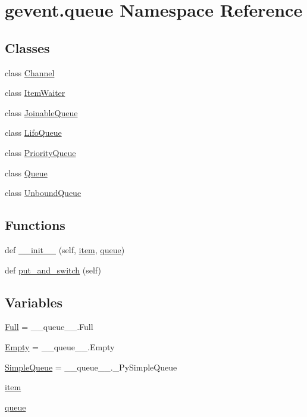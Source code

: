 \hypertarget{namespacegevent_1_1queue}{}\section{gevent.\+queue Namespace Reference}
\label{namespacegevent_1_1queue}
\subsection*{Classes}
\begin{DoxyCompactItemize}
\item 
class \hyperlink{classgevent_1_1queue_1_1_channel}{Channel}
\item 
class \hyperlink{classgevent_1_1queue_1_1_item_waiter}{Item\+Waiter}
\item 
class \hyperlink{classgevent_1_1queue_1_1_joinable_queue}{Joinable\+Queue}
\item 
class \hyperlink{classgevent_1_1queue_1_1_lifo_queue}{Lifo\+Queue}
\item 
class \hyperlink{classgevent_1_1queue_1_1_priority_queue}{Priority\+Queue}
\item 
class \hyperlink{classgevent_1_1queue_1_1_queue}{Queue}
\item 
class \hyperlink{classgevent_1_1queue_1_1_unbound_queue}{Unbound\+Queue}
\end{DoxyCompactItemize}
\subsection*{Functions}
\begin{DoxyCompactItemize}
\item 
def \hyperlink{namespacegevent_1_1queue_a6f4ff6495671a7b33203d6c2a2851385}{\+\_\+\+\_\+init\+\_\+\+\_\+} (self, \hyperlink{namespacegevent_1_1queue_a3b4a2cf37a35c27b4bac24acc4ade004}{item}, \hyperlink{namespacegevent_1_1queue_aafc5b38b758a538123873f27a8a17079}{queue})
\item 
def \hyperlink{namespacegevent_1_1queue_a6c4bfb0d85aba1f9a7c0195a7a6b1cbc}{put\+\_\+and\+\_\+switch} (self)
\end{DoxyCompactItemize}
\subsection*{Variables}
\begin{DoxyCompactItemize}
\item 
\hyperlink{namespacegevent_1_1queue_ad19ae3f5a26f98c0b2eec184c389bea4}{Full} = \+\_\+\+\_\+queue\+\_\+\+\_\+.\+Full
\item 
\hyperlink{namespacegevent_1_1queue_a21021e8a70b1f4d1ece2a18194cebb06}{Empty} = \+\_\+\+\_\+queue\+\_\+\+\_\+.\+Empty
\item 
\hyperlink{namespacegevent_1_1queue_aed06dab97e7dcb400e5cd4c7d2aca23c}{Simple\+Queue} = \+\_\+\+\_\+queue\+\_\+\+\_\+.\+\_\+\+Py\+Simple\+Queue
\item 
\hyperlink{namespacegevent_1_1queue_a3b4a2cf37a35c27b4bac24acc4ade004}{item}
\item 
\hyperlink{namespacegevent_1_1queue_aafc5b38b758a538123873f27a8a17079}{queue}
\end{DoxyCompactItemize}


